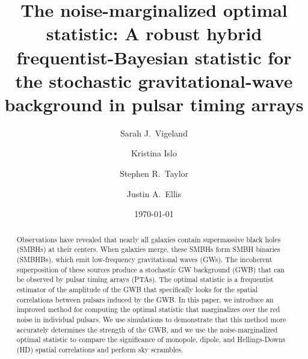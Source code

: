 \documentclass[twocolumn,aps,prd,superscriptaddress]{revtex4-1}
\begin{document}
\title{The noise-marginalized optimal statistic: A robust hybrid frequentist-Bayesian statistic for the stochastic gravitational-wave background in pulsar timing arrays}

\author{Sarah J.\ Vigeland}

\author{Kristina Islo}

\author{Stephen R.\ Taylor}

\author{Justin A.\ Ellis}


\date{\today}  

\begin{abstract}
Observations have revealed that nearly all galaxies 
contain supermassive black holes (SMBHs) at their centers. 
When galaxies merge, these SMBHs form SMBH binaries (SMBHBs), 
which emit low-frequency gravitational waves (GWs). 
The incoherent superposition of these sources produce a stochastic GW background (GWB) 
that can be observed by pulsar timing arrays (PTAs). 
The optimal statistic is a frequentist estimator of the amplitude of the GWB 
that specifically looks for the spatial correlations between pulsars induced by the GWB. 
In this paper, we introduce an improved method for computing the optimal statistic 
that marginalizes over the red noise in individual pulsars. 
We use simulations to demonstrate that this method 
more accurately determines the strength of the GWB, 
and we use the noise-marginalized optimal statistic 
to compare the significance of monopole, dipole, and Hellings-Downs (HD) spatial correlations 
and perform sky scrambles.
\end{abstract}
\end{document}
